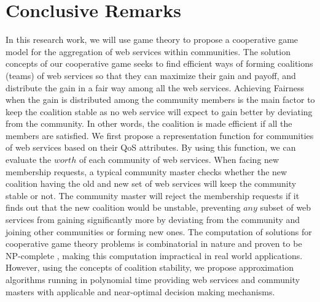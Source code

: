 \section{Conclusive Remarks}


        In this research work, we will use game theory to
        propose a cooperative game model for the aggregation of web
        services within communities. The solution concepts of our
        cooperative game seeks to find efficient ways of forming
        coalitions (teams) of web services so that they can maximize their
        gain and payoff, and distribute the gain in a fair way among all
        the web services. Achieving Fairness when the gain is distributed
        among the community members is the main factor to keep the
        coalition stable as no web service will expect to gain better by
        deviating from the community. In other words, the coalition is made
        efficient if all the members are satisfied. We first propose a
        representation function for communities of web services based on
        their QoS attributes. By using this function, we can evaluate the
        $worth$ of each community of web services. When facing new
        membership requests, a typical community master checks whether the
        new coalition having the old and new set of web services will keep
        the community stable or not. The community master will reject the
        membership requests if it finds out that the new coalition would
        be unstable, preventing $any$ subset of web services from gaining
        significantly more by deviating from the community and joining
        other communities or forming new ones. The computation of
        solutions for cooperative game theory problems is combinatorial in
        nature and proven to be NP-complete \cite{Algorithmic}, making
        this computation impractical in real world applications. However,
        using the concepts of coalition stability, we propose
        approximation algorithms running in polynomial time providing web
        services and community masters with applicable and near-optimal
        decision making mechanisms.
